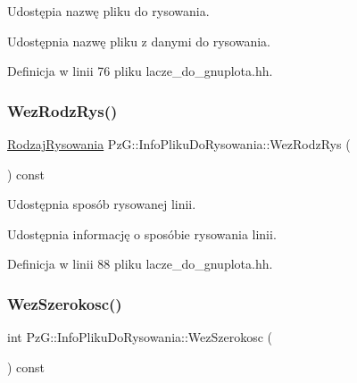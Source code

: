 Udostępia nazwę pliku do rysowania. 

Udostępnia nazwę pliku z danymi do rysowania. 

Definicja w linii 76 pliku lacze\+\_\+do\+\_\+gnuplota.\+hh.

\mbox{\label{class_pz_g_1_1_info_pliku_do_rysowania_a6a46f3c7b7a08dfa9d694f387f873234}} 
\subsubsection{\texorpdfstring{Wez\+Rodz\+Rys()}{WezRodzRys()}}
{\footnotesize\ttfamily \hyperlink{namespace_pz_g_a705c92106f39b7d0c34a6739d10ff0b6}{Rodzaj\+Rysowania} Pz\+G\+::\+Info\+Pliku\+Do\+Rysowania\+::\+Wez\+Rodz\+Rys (\begin{DoxyParamCaption}{ }\end{DoxyParamCaption}) const\hspace{0.3cm}{\ttfamily [inline]}}



Udostępnia sposób rysowanej linii. 

Udostępnia informację o sposóbie rysowania linii. 

Definicja w linii 88 pliku lacze\+\_\+do\+\_\+gnuplota.\+hh.

\mbox{\label{class_pz_g_1_1_info_pliku_do_rysowania_a627bb615c50f3b03374774e6b974488b}} 
\subsubsection{\texorpdfstring{Wez\+Szerokosc()}{WezSzerokosc()}}
{\footnotesize\ttfamily int Pz\+G\+::\+Info\+Pliku\+Do\+Rysowania\+::\+Wez\+Szerokosc (\begin{DoxyParamCaption}{ }\end{DoxyParamCaption}) const\hspace{0.3cm}{\ttfamily [inline]}}



